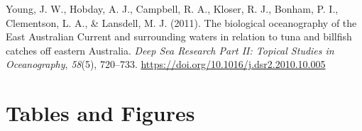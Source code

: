 \documentclass{article}
\newlength{\cslhangindent}
\newlength{\cslentryspacingunit} %
\newenvironment{CSLReferences}[2] %
 {%
  \setlength{\parindent}{0pt}
  \ifodd #1
  \let\oldpar\par
  \def\par{\hangindent=\cslhangindent\oldpar}
  \fi
  \setlength{\parskip}{#2\cslentryspacingunit}
 }%
 {}
\begin{document}
\begin{CSLReferences}{1}{0}
\leavevmode{}%
Young, J. W., Hobday, A. J., Campbell, R. A., Kloser, R. J., Bonham, P.
I., Clementson, L. A., \& Lansdell, M. J. (2011). The biological
oceanography of the East Australian Current and surrounding waters in
relation to tuna and billfish catches off eastern Australia. \emph{Deep
Sea Research Part II: Topical Studies in Oceanography}, \emph{58}(5),
720--733. \url{https://doi.org/10.1016/j.dsr2.2010.10.005}

\end{CSLReferences}

\newpage

\hypertarget{tables-and-figures}{%
\section*{Tables and Figures}\label{tables-and-figures}}
\end{document}
